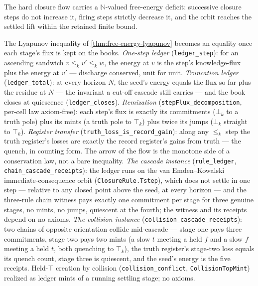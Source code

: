 \begin{theorem}\label{thm:free-energy-lyapunov}\leanok{}
The hard closure flow carries a \(\mathbb{N}\)-valued free-energy deficit:
successive closure steps do not increase it, firing steps strictly decrease it,
and the orbit reaches the settled lift within the retained finite bound.
\end{theorem}

\begin{theorem}\label{thm:stage-ledger}\leanok{}
The Lyapunov inequality of \cref{thm:free-energy-lyapunov} becomes an equality once each
stage's flux is kept on the books. \emph{One-step ledger}
(\texttt{ledger\_step}): for an ascending sandwich $v \le_k v' \le_k w$, the energy at
$v$ is the step's knowledge-flux plus the energy at $v'$ --- discharge conserved, unit
for unit. \emph{Truncation ledger} (\texttt{ledger\_total}): at every horizon $N$, the
seed's energy equals the flux so far plus the residue at $N$ --- the invariant a cut-off
cascade still carries --- and the book closes at quiescence
(\texttt{ledger\_closes}). \emph{Itemization}
(\texttt{stepFlux\_decomposition}, per-cell law axiom-free): each step's flux is exactly
its commitments ($\bot_k$ to a truth pole) plus its mints (a truth pole to $\top_k$)
plus twice its jumps ($\bot_k$ straight to $\top_k$). \emph{Register transfer}
(\texttt{truth\_loss\_is\_record\_gain}): along any $\le_k$ step the truth register's
losses are exactly the record register's gains from truth --- the quench, in counting
form. The arrow of the flow is the monotone side of a conservation law, not a bare
inequality. \emph{The cascade instance} (\texttt{rule\_ledger},
\texttt{chain\_cascade\_receipts}): the ledger runs on the van Emden--Kowalski
immediate-consequence orbit (\texttt{ClosureRule.Tstep}), which does not settle in one
step --- relative to any closed point above the seed, at every horizon --- and the
three-rule chain witness pays exactly one commitment per stage for three genuine stages,
no mints, no jumps, quiescent at the fourth; the witness and its receipts depend on no
axioms. \emph{The collision instance} (\texttt{collision\_cascade\_receipts}): two
chains of opposite orientation collide mid-cascade --- stage one pays three commitments,
stage two pays two mints (a slow $t$ meeting a held $f$ and a slow $f$ meeting a held
$t$, both quenching to $\top_k$), the truth register's stage-two loss equals its quench
count, stage three is quiescent, and the seed's energy is the five receipts. Held-$\top$
creation by collision (\texttt{collision\_conflict}, \texttt{CollisionTopMint})
realized as ledger mints of a running settling stage; no axioms.
\end{theorem}

